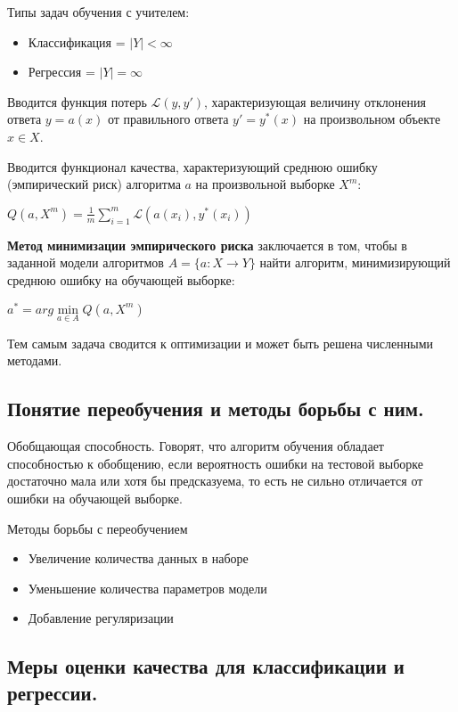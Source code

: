 \documentclass{article}
\begin{document}
Типы задач обучения с учителем:
\begin{itemize}
    \item Классификация = $|Y| < \infty$
    \item Регрессия = $|Y| = \infty$
\end{itemize}

Вводится функция потерь $\mathcal{L}(y, y')$, характеризующая величину
отклонения ответа $y = a(x)$ от правильного ответа $y' = y^*(x)$ на
произвольном объекте $x \in X$.

Вводится функционал качества, характеризующий среднюю ошибку
(эмпирический риск) алгоритма $a$ на произвольной выборке $X^m$:

$Q(a, X^m) = \frac{1}{m}\sum\limits_{i=1}^m \mathcal{L}(a(x_i), y^*(x_i))$

\textbf{Метод минимизации эмпирического риска} заключается в том, чтобы
в заданной модели алгоритмов $A = \{a: X \to Y\}$ найти алгоритм, минимизирующий
среднюю ошибку на обучающей выборке:

$a^* = arg \min\limits_{a \in A} Q(a, X^m)$

Тем самым задача сводится к оптимизации и может быть решена численными методами.


\subsection{Понятие переобучения и методы борьбы с ним.}

Обобщающая способность. Говорят, что алгоритм обучения обладает способностью
к обобщению, если вероятность ошибки на тестовой выборке достаточно
мала или хотя бы предсказуема, то есть не сильно отличается от ошибки
на обучающей выборке.


Методы борьбы с переобучением
\begin{itemize}
	\item Увеличение количества данных в наборе
	\item Уменьшение количества параметров модели
	\item Добавление регуляризации
\end{itemize}


\subsection{Меры оценки качества для классификации и регрессии.}
\end{document}
